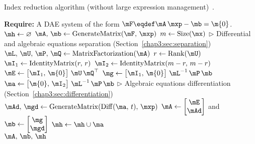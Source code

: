 \begin{breakablealgorithm}
  \caption{Index reduction algorithm (without large expression management)~\cite{stocco2024symbolic}.}
  \label{chap3:alg:index_reduction}
  \begin{algorithmic}[1]
    \State \textbf{Require:} A \ac{DAE} system of the form $\mF \eqdef \mA \, \mxp - \mb = \m{0}$.
     
      \State $\mh \gets \varnothing$ 
      \State $\mA, \, \mb \gets \mathrm{GenerateMatrix}(\mF, \, \mxp)$ 
      \State $m \gets \mathrm{Size}(\mx)$
        \State $\displaystyle\triangleright$ Differential and algebraic equations separation (Section~\ref{chap3:sec:separation})
        \State $\mL, \, \mU, \, \mP, \, \mQ \gets \mathrm{MatrixFactorization}(\mA)$ 
        \State $r \gets \mathrm{Rank}(\mU)$ 
        \State $\mI_1 \gets \mathrm{IdentityMatrix}(r, \, r)$ 
        \State $\mI_2 \gets \mathrm{IdentityMatrix}(m-r, \, m-r)$ 
        \State $\mE \gets \begin{bmatrix} \mI_1, \, \m{0} \end{bmatrix} \, \mU \, \mQ^\top$ 
        \State $\mg \gets \begin{bmatrix} \mI_1, \, \m{0} \end{bmatrix} \, \mL^{-1} \, \mP \, \mb$ 
        \State $\ma \gets \begin{bmatrix} \m{0}, \, \mI_2 \end{bmatrix} \, \mL^{-1} \, \mP \, \mb$ 
        \State $\displaystyle\triangleright$ Algebraic equations differentiation (Section~\ref{chap3:sec:differentiation})
        \State $\mAd, \, \mgd \gets \mathrm{GenerateMatrix}(\mathrm{Diff}(\ma, \, t), \, \mxp)$ 
        \State $\mA \gets \begin{bmatrix} \mE \\ \mAd \end{bmatrix}$ and $\mb \gets \begin{bmatrix} \mg \\ \mgd \end{bmatrix}$
        \State $\mh \gets \mh \cup \ma$ 
      \EndWhile \\
      \Return $\mA, \, \mb, \, \mh$ 
    \EndProcedure
  \end{algorithmic}
\end{breakablealgorithm}

